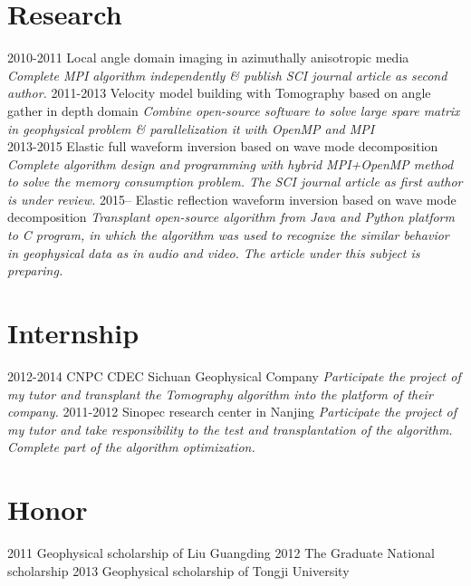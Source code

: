 \documentclass[]{friggeri-encv}
\begin{document}
\section{Research}

\begin{entrylist}
  \entry
    {2010-2011}
	{Local angle domain imaging in azimuthally anisotropic media }
	{\emph{Complete MPI algorithm independently \& publish SCI journal article as
	second author.}}
  \entry
    {2011-2013}
    {Velocity model building with Tomography based on angle gather in depth domain}
    {\emph{Combine open-source software to solve large spare matrix 
		in geophysical problem \& parallelization it with OpenMP and MPI\\
	}}
  \entry
    {2013-2015}
    {Elastic full waveform inversion based on wave mode decomposition}
    {\emph{
		Complete algorithm design and programming with hybrid MPI+OpenMP method
		to solve the memory consumption problem. The SCI journal
		article as first author is under review.
	}}
  \entry
    {2015--}
    {Elastic reflection waveform inversion based on wave mode decomposition}
	{\emph{
		Transplant open-source algorithm from Java and Python platform to C program,
		in which the algorithm was used to recognize the similar
		behavior in geophysical data as in audio and video. The article under this
		subject is preparing.
	}}
\end{entrylist}

\section{Internship}
\begin{entrylist}
  \entry
    {2012-2014}
	{CNPC CDEC Sichuan Geophysical Company}
	{\emph{
		Participate the project of my tutor and 
		transplant the Tomography algorithm into the platform of their company.
	}}
  \entry
    {2011-2012}
    {Sinopec research center in Nanjing}
	{\emph{
		Participate the project of my tutor and take responsibility to the
		test and transplantation of the algorithm. Complete part of the algorithm
		optimization.
	}}
\end{entrylist}
\section{Honor}
\begin{entrylist}
  \entryTwo
    {2011}
    {Geophysical scholarship of Liu Guangding}
  \entryTwo
    {2012}
	{The Graduate National scholarship}
  \entryTwo
    {2013}
    {Geophysical scholarship of Tongji University}
\par\vspace{\parskip}
\end{entrylist}
\end{document}
